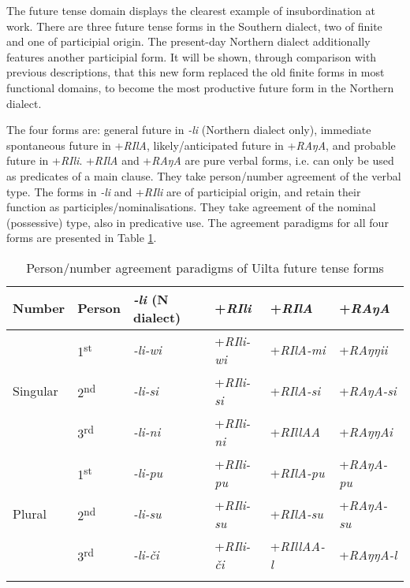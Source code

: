 \documentclass[output=paper,colorlinks,citecolor=brown]{langscibook}
\begin{document}
The  future tense domain displays the clearest example of insubordination at work. There are three future tense forms in the Southern dialect, two of finite and one of participial origin. The present-day Northern dialect additionally features another participial form. It will be shown, through comparison with previous descriptions, that this new form replaced the old finite forms in most functional domains, to become the most productive future form in the Northern dialect.

The four forms are: general future in \textit{-li} (Northern dialect only), immediate spontaneous future in +\textit{RIlA}, likely/anticipated future in +\textit{RAŋA}, and probable future in +\textit{RIli}. +\textit{RIlA} and +\textit{RAŋA} are pure verbal forms, i.e. can only be used as predicates of a main clause. They take person/number agreement of the verbal type. The forms in \textit{-li} and +\textit{RIli} are of participial origin, and retain their function as participles/nominalisations. They take agreement of the nominal (possessive) type, also in predicative use. The agreement paradigms for all four forms are presented in Table \ref{table:5}.

\begin{table}
\caption{Person/number agreement paradigms of Uilta future tense forms}
\label{table:5}
 \begin{tabular}{llllll}
  \lsptoprule
Number & Person & \textit{-li} (N dialect) & +\textit{RIli} & +\textit{RIlA} & +\textit{RAŋA}\\
  \midrule
  &   1\textsuperscript{st}  &   \textit{-li-wi}      & +\textit{RIli-wi} & +\textit{RIlA-mi} & +\textit{RAŋŋii}\\
  Singular  &  2\textsuperscript{nd}  &   \textit{-li-si}  & +\textit{RIli-si} & +\textit{RIlA-si}    & +\textit{RAŋA-si}\\
  &    3\textsuperscript{rd}  &   \textit{-li-ni}      & +\textit{RIli-ni} & +\textit{RIllAA} & +\textit{RAŋŋAi}\\
  \midrule
  &   1\textsuperscript{st}  &   \textit{-li-pu}      & +\textit{RIli-pu} & +\textit{RIlA-pu} & +\textit{RAŋA-pu}\\
  Plural  & 2\textsuperscript{nd}  &    \textit{-li-su}      & +\textit{RIli-su} & +\textit{RIlA-su} & +\textit{RAŋA-su}\\
  &  3\textsuperscript{rd} &   \textit{-li-či}      & +\textit{RIli-či} & +\textit{RIllAA-l} & +\textit{RAŋŋA-l}\\
  \lspbottomrule
 \end{tabular}
\end{table}
\end{document}
